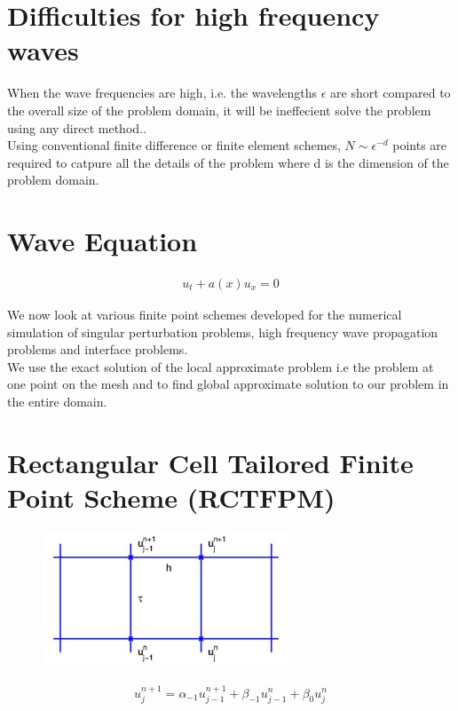 \section{Difficulties for high frequency waves}
When the wave frequencies are high, i.e. the
wavelengths $\epsilon$ are short compared to the overall size of the problem domain, it will be ineffecient solve the problem using any direct method..\\
Using conventional finite difference or finite element schemes, $N \sim \epsilon^{-d}$ points are required to catpure all the details of the problem where 
d is the dimension of the problem domain.\\


\section{Wave Equation}

\begin{align}
 u_{t} + a(x)u_{x} = 0
\end{align}

We now look at various finite point schemes developed for the numerical simulation of singular
perturbation problems, high frequency wave propagation problems and interface problems.\\
We use the exact solution of the local approximate problem i.e the problem at one point on the mesh
and to find global approximate solution to our problem in the entire domain.

\section{Rectangular Cell Tailored Finite Point Scheme (RCTFPM)}
\begin{figure}[htbp]
	\centering
		\includegraphics[height=4cm]{Figures/RCTFPM_mesh.eps}\\
	\caption[RCTFPM imaginary part]{}
\end{figure}



\begin{align*}
 u_{j}^{n+1} = \alpha_{-1}u_{j-1}^{n+1} + \beta_{-1}u_{j-1}^{n} + \beta_{0}u_{j}^{n}
\end{align*}

